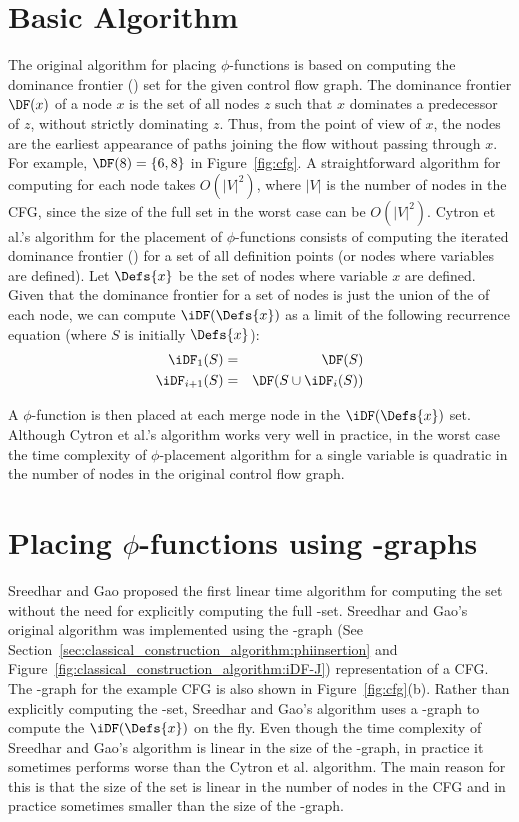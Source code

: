 {\section{Basic Algorithm}
The original algorithm for placing $\phi$-functions
is based on computing the dominance frontier (\DF) set for the given control flow graph. The dominance frontier $\DF(x)$ of a node $x$ is the set of all nodes 
 $z$ such that $x$ dominates a predecessor of $z$, without strictly dominating $z$. Thus, from the point of view of $x$, the \DF nodes are the earliest appearance of paths joining the flow without passing through $x$.
For example, $\DF(8)= \{ 6, 8 \}$ in Figure~\ref{fig:cfg}. A straightforward algorithm for computing
\DF for each node takes $O(|V|^2)$, where $|V|$ is the number of nodes in the 
CFG, since the size of the full \DF set in the worst case can be $O(|V|^2)$.
Cytron et al.'s algorithm for the placement of $\phi$-functions consists of 
computing the iterated dominance frontier (\iDF) for a set of all definition points (or nodes where
variables are defined). 
Let $\Defs{x}$ be the set of nodes where variable $x$ are  defined.
Given that the dominance frontier for a set of nodes is just the
union of the \DF of each node, we can compute $\iDF(\Defs{x})$ as a limit of
the following recurrence equation (where $S$ is initially $\Defs{x}$):
\begin{eqnarray*}
\iDF_1(S) &=& \DF(S) \\
\iDF_{i+1} (S) &=& \DF(S \cup \iDF_i(S)) 
\end{eqnarray*}

A $\phi$-function is then placed at each merge node in the  $\iDF(\Defs{x})$ set. 
Although Cytron et al.'s
algorithm works very well in practice, in the worst case the time complexity of $\phi$-placement algorithm for a single variable is quadratic in the number of nodes in the original control flow graph.


\section{Placing $\phi$-functions using \DJ-graphs}
Sreedhar and Gao proposed the first linear time algorithm for computing the \iDF set without the need for explicitly computing the full \DF-set. Sreedhar and Gao's original algorithm was implemented using the \DJ-graph (See Section~\ref{sec:classical_construction_algorithm:phiinsertion} and Figure~\ref{fig:classical_construction_algorithm:iDF-J}) representation of a CFG. 
The \DJ-graph for the example CFG is also shown in Figure~\ref{fig:cfg}(b). Rather than explicitly computing the \DF-set, Sreedhar and Gao's algorithm uses a \DJ-graph to compute the  $\iDF(\Defs{x})$ on the fly. Even though the time complexity of Sreedhar and Gao's algorithm is linear in the size of the \DJ-graph, in practice it sometimes performs worse than the Cytron et al. algorithm. The main reason for this is that the size of the \DF set is linear in the number of nodes in the CFG 
and in practice sometimes smaller than the size of the \DJ-graph. 


}
